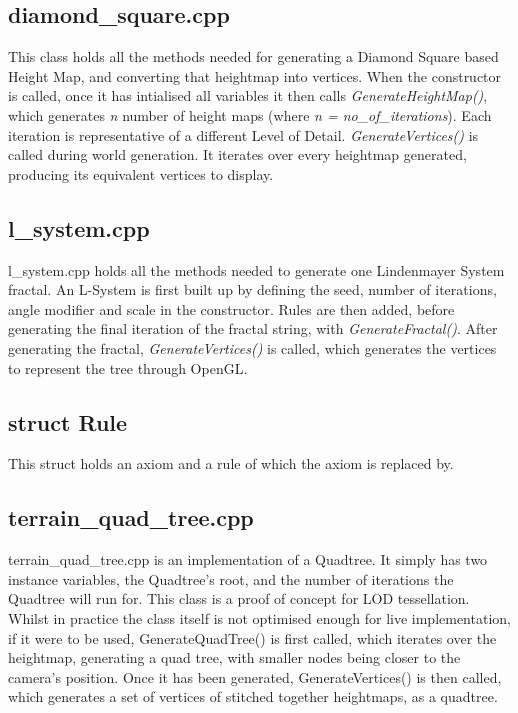 \documentclass[a4paper,10pt]{report}
\begin{document}
\subsection{diamond\_square.cpp}

This class holds all the methods needed for generating a Diamond Square based Height Map, and converting that heightmap into vertices. When the constructor is called, once it has intialised all variables it then calls \textit{GenerateHeightMap()}, which generates \textit{n} number of height maps (where \textit{n = no\_of\_iterations}). Each iteration is representative of a different Level of Detail. \textit{GenerateVertices()} is called during world generation. It iterates over every heightmap generated, producing its equivalent vertices to display. 

\subsection{l\_system.cpp}
l\_system.cpp holds all the methods needed to generate one Lindenmayer System fractal. An L-System is first built up by defining the seed, number of iterations, angle modifier and scale in the constructor. Rules are then added, before generating the final iteration of the fractal string, with \textit{GenerateFractal()}. After generating the fractal, \textit{GenerateVertices()} is called, which generates the vertices to represent the tree through OpenGL.

\subsection{struct Rule}
This struct holds an axiom and a rule of which the axiom is replaced by. 

\subsection{terrain\_quad\_tree.cpp}
terrain\_quad\_tree.cpp is an implementation of a Quadtree. It simply has two instance variables, the Quadtree's root, and the number of iterations the Quadtree will run for. This class is a proof of concept for LOD tessellation. Whilst in practice the class itself is not optimised enough for live implementation, if it were to be used, GenerateQuadTree() is first called, which iterates over the heightmap, generating a quad tree, with smaller nodes being closer to the camera's position. Once it has been generated, GenerateVertices() is then called, which generates a set of vertices of stitched together heightmaps, as a quadtree. 
\end{document}

